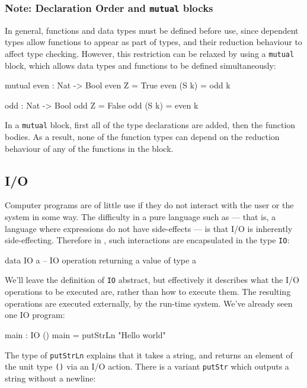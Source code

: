 \subsubsection*{Note: Declaration Order and \texttt{mutual} blocks}

In general, functions and data types must be defined before use, since dependent types allow functions to appear as part of types, and their reduction behaviour to affect type checking.
However, this restriction can be relaxed by using a \texttt{mutual} block, which allows data types and functions to be defined simultaneously:

\begin{code}
mutual
  even : Nat -> Bool
  even Z = True
  even (S k) = odd k

  odd : Nat -> Bool
  odd Z = False
  odd (S k) = even k
\end{code}


\noindent
In a \texttt{mutual} block, first all of the type declarations are added, then the function bodies.
As a result, none of the function types can depend on the reduction behaviour of any of the functions in the block.

\subsection{I/O}

Computer programs are of little use if they do not interact with the user or the system in some way.
The difficulty in a pure language such as \Idris{} --- that is, a language where expressions do not have side-effects --- is that I/O is inherently side-effecting.
Therefore in \Idris{}, such interactions are encapsulated in the type \texttt{IO}:

\begin{code}
data IO a -- IO operation returning a value of type a
\end{code}

\noindent
We'll leave the definition of \texttt{IO} abstract, but effectively it describes what the I/O operations to be executed are, rather than how to execute them.
The resulting operations are executed externally, by the run-time system.
We've already seen one IO program:

\begin{code}
main : IO ()
main = putStrLn "Hello world"
\end{code}


\noindent
The type of \texttt{putStrLn} explains that it takes a string, and returns an element of the unit type \texttt{()} via an I/O action.
There is a variant \texttt{putStr} which outputs a string without a newline:

